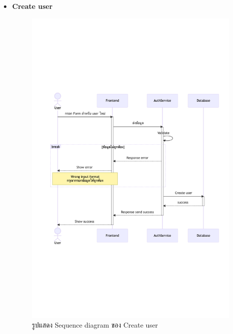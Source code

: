 \documentclass[12pt,oneside,openright,a4paper]{cpe-thai-project}
\begin{document}
\begin{itemize}
    \newpage
    \item \textbf{Create user} \\
    \begin{figure}[!ht]\centering
        \includegraphics[width=13cm, trim={0 9cm 0 9cm},clip]{./assets/sequence-diagram/create-user.png}
        \caption{รูปแสดง Sequence diagram ของ Create user}\label{fig:sqCreateUser}
    \end{figure}


\end{itemize}
\end{document}
